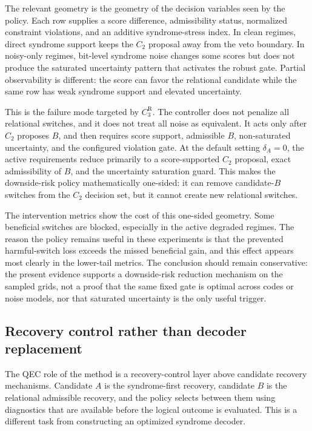 \documentclass{iopjournal}
\begin{document}
The relevant geometry is the geometry of the decision variables seen by the
policy. Each row supplies a score difference, admissibility status, normalized
constraint violations, and an additive syndrome-stress index. In clean regimes,
direct syndrome support keeps the $C_2$ proposal away from the veto boundary. In
noisy-only regimes, bit-level syndrome noise changes some scores but does not
produce the saturated uncertainty pattern that activates the robust gate. Partial
observability is different: the score can favor the relational candidate while the
same row has weak syndrome support and elevated uncertainty.

This is the failure mode targeted by $C_3^{\mathrm R}$. The controller does not
penalize all relational switches, and it does not treat all noise as equivalent.
It acts only after $C_2$ proposes $B$, and then requires score support,
admissible $B$, non-saturated uncertainty, and the configured violation gate. At
the default setting $\delta_A=0$, the active requirements reduce primarily to a
score-supported $C_2$ proposal, exact admissibility of $B$, and the uncertainty
saturation guard. This makes the downside-risk policy mathematically one-sided:
it can remove candidate-$B$ switches from the $C_2$ decision set, but it cannot
create new relational switches.

The intervention metrics show the cost of this one-sided geometry. Some
beneficial switches are blocked, especially in the active degraded regimes. The
reason the policy remains useful in these experiments is that the prevented
harmful-switch loss exceeds the missed beneficial gain, and this effect appears
most clearly in the lower-tail metrics. The conclusion should remain conservative:
the present evidence supports a downside-risk reduction mechanism on the sampled
grids, not a proof that the same fixed gate is optimal across codes or noise
models, nor that saturated uncertainty is the only useful trigger.

\subsection{Recovery control rather than decoder replacement}
\label{subsec:discussion-recovery-control}

The QEC role of the method is a recovery-control layer above candidate recovery
mechanisms. Candidate $A$ is the syndrome-first recovery, candidate $B$ is the
relational admissible recovery, and the policy selects between them using
diagnostics that are available before the logical outcome is evaluated. This is a
different task from constructing an optimized syndrome decoder.
\end{document}

